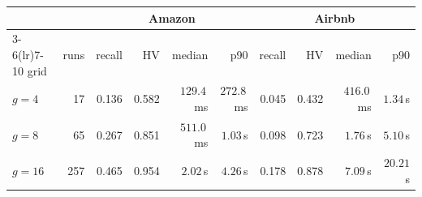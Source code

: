 \setlength{\tabcolsep}{3.5pt}%
\begin{tabular}{lrrrrrrrrr}
\toprule
& & \multicolumn{4}{c}{Amazon} & \multicolumn{4}{c}{Airbnb} \\
\cmidrule(lr){3-6}\cmidrule(lr){7-10}
grid & runs & recall & HV & median & p90 & recall & HV & median & p90 \\
\midrule
$g{=}4$ & 17 & 0.136 & 0.582 & $129.4$\,ms & $272.8$\,ms & 0.045 & 0.432 & $416.0$\,ms & $1.34$\,s \\
$g{=}8$ & 65 & 0.267 & 0.851 & $511.0$\,ms & $1.03$\,s & 0.098 & 0.723 & $1.76$\,s & $5.10$\,s \\
$g{=}16$ & 257 & 0.465 & 0.954 & $2.02$\,s & $4.26$\,s & 0.178 & 0.878 & $7.09$\,s & $20.21$\,s \\
\bottomrule
\end{tabular}
